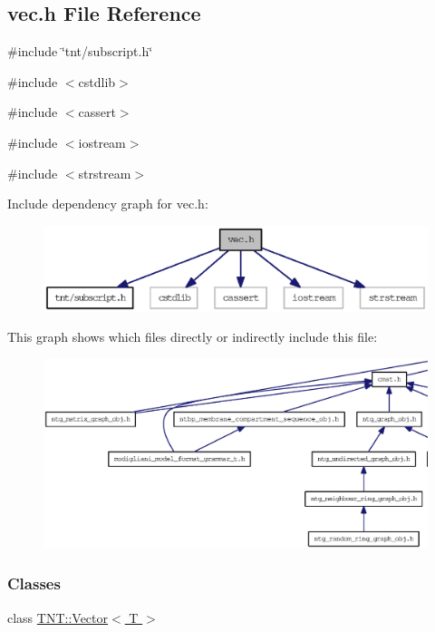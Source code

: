 \subsection{vec.h File Reference}
\label{vec_8h}
{\ttfamily \#include \char`\"{}tnt/subscript.h\char`\"{}}\par
{\ttfamily \#include $<$cstdlib$>$}\par
{\ttfamily \#include $<$cassert$>$}\par
{\ttfamily \#include $<$iostream$>$}\par
{\ttfamily \#include $<$strstream$>$}\par
Include dependency graph for vec.h:
\nopagebreak
\begin{figure}[H]
\begin{center}
\leavevmode
\includegraphics[width=400pt]{vec_8h__incl}
\end{center}
\end{figure}
This graph shows which files directly or indirectly include this file:
\nopagebreak
\begin{figure}[H]
\begin{center}
\leavevmode
\includegraphics[width=400pt]{vec_8h__dep__incl}
\end{center}
\end{figure}
\subsubsection*{Classes}
\begin{DoxyCompactItemize}
\item 
class \hyperlink{class_t_n_t_1_1_vector}{TNT::Vector$<$ T $>$}
\end{DoxyCompactItemize}

